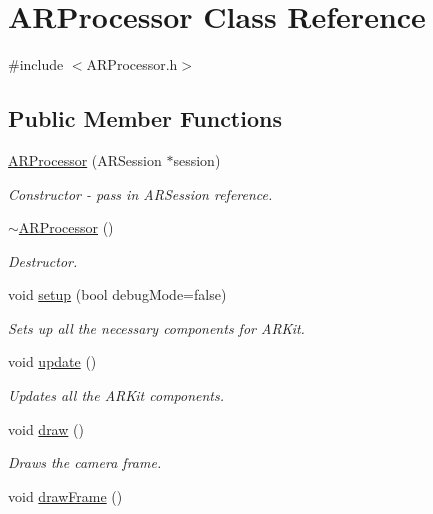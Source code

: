 \hypertarget{class_a_r_processor}{}\section{A\+R\+Processor Class Reference}
\label{class_a_r_processor}


{\ttfamily \#include $<$A\+R\+Processor.\+h$>$}

\subsection*{Public Member Functions}
\begin{DoxyCompactItemize}
\item 
\hyperlink{class_a_r_processor_a2dda14173a82870379c111d13a0562d6}{A\+R\+Processor} (A\+R\+Session $\ast$session)
\begin{DoxyCompactList}\small\item\em Constructor -\/ pass in A\+R\+Session reference. \end{DoxyCompactList}\item 
\hyperlink{class_a_r_processor_a9bd83aa6f017e308d1e55e709621ae84}{$\sim$\+A\+R\+Processor} ()
\begin{DoxyCompactList}\small\item\em Destructor. \end{DoxyCompactList}\item 
void \hyperlink{class_a_r_processor_a1a41547daccb7c6810bc2693ea6d5487}{setup} (bool debug\+Mode=false)
\begin{DoxyCompactList}\small\item\em Sets up all the necessary components for A\+R\+Kit. \end{DoxyCompactList}\item 
void \hyperlink{class_a_r_processor_a76b6cbb62dcc0aa87e38e48cc8dbe621}{update} ()
\begin{DoxyCompactList}\small\item\em Updates all the A\+R\+Kit components. \end{DoxyCompactList}\item 
void \hyperlink{class_a_r_processor_a20418bd305702c3346a109da9e1afcb0}{draw} ()
\begin{DoxyCompactList}\small\item\em Draws the camera frame. \end{DoxyCompactList}\item 
void \hyperlink{class_a_r_processor_a685469fa6b66b8b5d935f6f45a2ef599}{draw\+Frame} ()

\end{DoxyCompactItemize}
